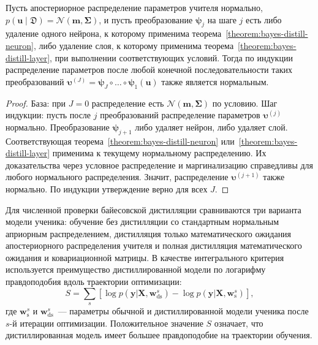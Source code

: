 \begin{corollary}\label{cor:bayes-distill-iterative}
Пусть апостериорное распределение параметров учителя нормально, $p(\mathbf{u}\mid\mathfrak{D})=\mathcal{N}(\mathbf{m},\mathbf{\Sigma})$, и пусть преобразование $\boldsymbol{\psi}_j$ на шаге $j$ есть либо удаление одного нейрона, к которому применима теорема~\ref{theorem:bayes-distill-neuron}, либо удаление слоя, к которому применима теорема~\ref{theorem:bayes-distill-layer}, при выполнении соответствующих условий. Тогда по индукции распределение параметров после любой конечной последовательности таких преобразований $\boldsymbol{\upsilon}^{(J)}=\boldsymbol{\psi}_J\circ\ldots\circ\boldsymbol{\psi}_1(\mathbf{u})$ также является нормальным.
\end{corollary}

\begin{proof}
База: при $J=0$ распределение есть $\mathcal{N}(\mathbf{m},\mathbf{\Sigma})$ по условию.
Шаг индукции: пусть после $j$ преобразований распределение параметров $\boldsymbol{\upsilon}^{(j)}$ нормально.
Преобразование $\boldsymbol{\psi}_{j+1}$ либо удаляет нейрон, либо удаляет слой.
Соответствующая теорема~\ref{theorem:bayes-distill-neuron} или~\ref{theorem:bayes-distill-layer} применима к текущему нормальному распределению.
Их доказательства через условное распределение и маргинализацию справедливы для любого нормального распределения.
Значит, распределение $\boldsymbol{\upsilon}^{(j+1)}$ также нормально.
По индукции утверждение верно для всех $J$. \end{proof}

Для численной проверки байесовской дистилляции сравниваются три варианта модели ученика: обучение без дистилляции со стандартным нормальным априорным распределением, дистилляция только математического ожидания апостериорного распределения учителя и полная дистилляция математического ожидания и ковариационной матрицы. В качестве интегрального критерия используется преимущество дистиллированной модели по логарифму правдоподобия вдоль траектории оптимизации:
\[
    S =
    \sum_s
    \left[
        \log p(\mathbf{y}|\mathbf{X},\mathbf{w}_{\mathrm{ds}}^s)
        -
        \log p(\mathbf{y}|\mathbf{X},\mathbf{w}_{\mathrm{s}}^s)
    \right],
\]
где $\mathbf{w}_{\mathrm{s}}^s$ и $\mathbf{w}_{\mathrm{ds}}^s$~--- параметры обычной и дистиллированной модели ученика после $s$-й итерации оптимизации. Положительное значение $S$ означает, что дистиллированная модель имеет большее правдоподобие на траектории обучения.

